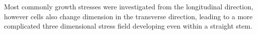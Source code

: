 Most commonly growth stresses were investigated from the longitudinal direction,
however cells also change dimension in the transverse direction, leading to a
more complicated three dimensional stress field developing even within a
straight stem.